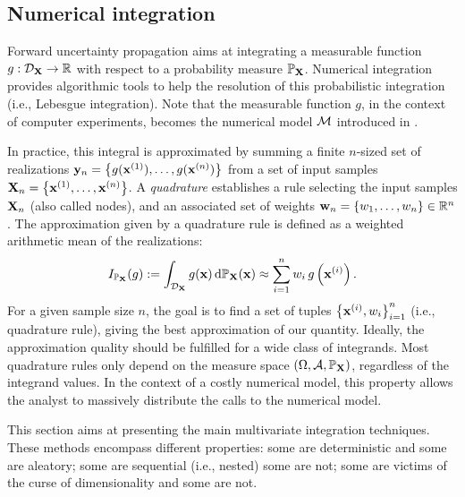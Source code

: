 \subsection{Numerical integration}
Forward uncertainty propagation aims at integrating a measurable function $g: \mathcal{D}_{{\bf X}} \rightarrow \mathbb{R}$ with respect to a probability measure $\mathbb{P}_{{\bf X}}$. 
Numerical integration provides algorithmic tools to help the resolution of this probabilistic integration (i.e., Lebesgue integration). 
Note that the measurable function $g$, in the context of computer experiments, becomes the numerical model $\mathcal{M}$ introduced in . 

In practice, this integral is approximated by summing a finite $n$-sized set of realizations ${\bf y}_n = \left\{g({\bf x}^{(1)}), \dots, g({\bf x}^{(n)})\right\}$ from a set of input samples ${\bf X}_n = \left\{{\bf x}^{(1)}, \dots, {\bf x}^{(n)}\right\}$. 
A \textit{quadrature} establishes a rule selecting the input samples ${\bf X}_n$ (also called nodes), and an associated set of weights ${\bf w}_n = \{w_1, \dots, w_n\} \in \mathbb{R}^n$. 
The approximation given by a quadrature rule is defined as a weighted arithmetic mean of the realizations:
\begin{equation}
    I_{\mathbb{P}_{{\bf X}}}(g) := \int_{\mathcal{D}_{\bf X}} g({\bf x}) \, \mathrm{d}\mathbb{P}_{{\bf X}}({\bf x}) \approx \sum_{i=1}^n w_i \, g\left({\bf x}^{(i)}\right).
\end{equation}
For a given sample size $n$, the goal is to find a set of tuples $\left\{{\bf x}^{(i)}, w_i \right\}_{i=1}^n$ (i.e., quadrature rule), giving the best approximation of our quantity. 
Ideally, the approximation quality should be fulfilled for a wide class of integrands. 
Most quadrature rules only depend on the measure space $(\Omega, \mathcal{A}, \mathbb{P}_{{\bf X}})$, regardless of the integrand values. 
In the context of a costly numerical model, this property allows the analyst to massively distribute the calls to the numerical model. 

This section aims at presenting the main multivariate integration techniques. 
These methods encompass different properties: 
some are deterministic and some are aleatory; 
some are sequential (i.e., nested) some are not; 
some are victims of the curse of dimensionality and some are not. 


